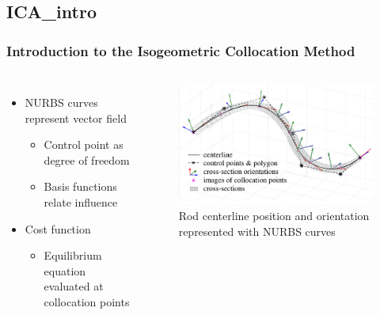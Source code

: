 \documentclass[compress]{thesisbeamer}
\begin{document}
		\subsection{ICA_intro}
        \begin{frame}
        	\frametitle{Introduction to the Isogeometric Collocation Method}
			\begin{columns}
			\begin{itemize}%
  				\item NURBS curves represent vector field
  				\begin{itemize}
  					\item Control point as degree of freedom
  					\item Basis functions relate influence
  				\end{itemize}
  				\item Cost function
  				\begin{itemize}
  					\item Equilibrium equation evaluated at collocation points
  				\end{itemize}
 			\end{itemize}
			\begin{figure}[h]
				\centering
				\includegraphics[width=\textwidth]{images/ICA}
				\caption{Rod centerline position and orientation represented with NURBS curves}
			\end{figure}
			\end{columns}
		\end{frame}
		
\end{document}

